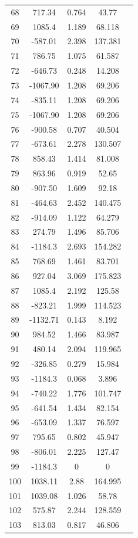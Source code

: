{\begin{longtable}{ccccc}
68 & 717.34 & 0.764 & 43.77 \\
69 & 1085.4 & 1.189 & 68.118 \\
70 & -587.01 & 2.398 & 137.381 \\
71 & 786.75 & 1.075 & 61.587 \\
72 & -646.73 & 0.248 & 14.208 \\
73 & -1067.90 & 1.208 & 69.206 \\
74 & -835.11 & 1.208 & 69.206 \\
75 & -1067.90 & 1.208 & 69.206 \\
76 & -900.58 & 0.707 & 40.504 \\
77 & -673.61 & 2.278 & 130.507 \\
78 & 858.43 & 1.414 & 81.008 \\
79 & 863.96 & 0.919 & 52.65 \\
80 & -907.50 & 1.609 & 92.18 \\
81 & -464.63 & 2.452 & 140.475 \\
82 & -914.09 & 1.122 & 64.279 \\
83 & 274.79 & 1.496 & 85.706 \\
84 & -1184.3 & 2.693 & 154.282 \\
85 & 768.69 & 1.461 & 83.701 \\
86 & 927.04 & 3.069 & 175.823 \\
87 & 1085.4 & 2.192 & 125.58 \\
88 & -823.21 & 1.999 & 114.523 \\
89 & -1132.71 & 0.143 & 8.192 \\
90 & 984.52 & 1.466 & 83.987 \\
91 & 480.14 & 2.094 & 119.965 \\
92 & -326.85 & 0.279 & 15.984 \\
93 & -1184.3 & 0.068 & 3.896 \\
94 & -740.22 & 1.776 & 101.747 \\
95 & -641.54 & 1.434 & 82.154 \\
96 & -653.09 & 1.337 & 76.597 \\
97 & 795.65 & 0.802 & 45.947 \\
98 & -806.01 & 2.225 & 127.47 \\
99 & -1184.3 & 0 & 0 \\
100 & 1038.11 & 2.88 & 164.995 \\
101 & 1039.08 & 1.026 & 58.78 \\
102 & 575.87 & 2.244 & 128.559 \\
103 & 813.03 & 0.817 & 46.806 \\

\end{longtable}}
